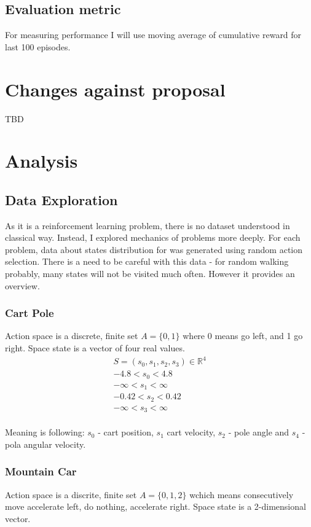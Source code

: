 \documentclass[12pt]{article}
\begin{document}
\subsection{Evaluation metric}

For measuring performance I will use moving average of cumulative reward for last 100 episodes.

\section{Changes against proposal}
TBD

\section{Analysis}
\subsection{Data Exploration}

As it is a reinforcement learning problem, there is no dataset understood in classical way. Instead, I explored mechanics of problems more deeply. For each problem, data about states distribution for was generated using random action selection. There is a need to be careful with this data - for random walking probably, many states will not be visited much often. However it provides an overview.

\subsubsection{Cart Pole}

Action space is a discrete, finite set $A = \{0,1\}$ where 0 means go left, and 1 go right.
Space state is a vector of four real values. 
\begin{multline}
 S = (s_0, s_1, s_2, s_3) \in \mathbb{R}^4 \\
-4.8 < s_0 < 4.8 \\
-\infty < s_1 < \infty \\
-0.42 < s_2 < 0.42 \\
-\infty < s_3 < \infty \\
\end{multline}

Meaning is following: $s_0$ - cart position, $s_1$ cart velocity, $s_2$ - pole angle and $s_4$ - pola angular velocity.


\subsubsection{Mountain Car}
Action space is a discrite, finite set $A = \{0,1,2\}$ wchich means consecutively move accelerate left, do nothing, accelerate right. Space state is a 2-dimensional vector.
\end{document}
